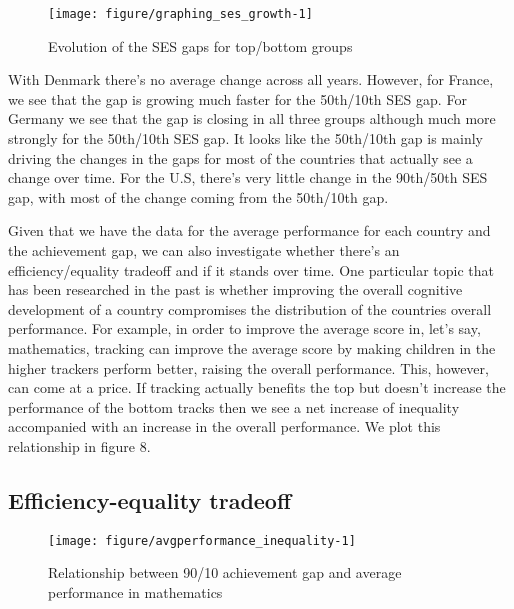 \documentclass[11pt, a4paper]{article}\usepackage[]{graphicx}\usepackage[]{color}
\begin{document}
\begin{figure}
\begin{center}


{\centering \texttt{[image: figure/graphing\_ses\_growth-1]} 

}



\caption{Evolution of the SES gaps for top/bottom groups}
\end{center}
\end{figure}

With Denmark there's no average change across all years. However, for France, we see that the gap is growing much faster for the 50th/10th SES gap. For Germany we see that the gap is closing in all three groups although much more strongly for the 50th/10th SES gap. It looks like the 50th/10th gap is mainly driving the changes in the gaps for most of the countries that actually see a change over time.  For the U.S, there's very little change in the 90th/50th SES gap, with most of the change coming from the 50th/10th gap.

Given that we have the data for the average performance for each country and the achievement gap, we can also investigate whether there's an efficiency/equality tradeoff and if it stands over time. One particular topic that has been researched in the past is whether improving the overall cognitive development of a country compromises the distribution of the countries overall performance. For example, in order to improve the average score in, let's say, mathematics, tracking can improve the average score by making children in the higher trackers perform better, raising the overall performance. This, however, can come at a price. If tracking actually benefits the top but doesn't increase the performance of the bottom tracks then we see a net increase of inequality accompanied with an increase in the overall performance. We plot this relationship in figure 8.

\subsection{Efficiency-equality tradeoff}




\begin{figure}
\begin{center}


{\centering \texttt{[image: figure/avgperformance\_inequality-1]} 

}



\caption{Relationship between 90/10 achievement gap and average performance in mathematics}
\end{center}
\end{figure}
\end{document}
